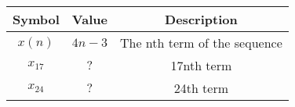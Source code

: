 
    \begin{tabular}{|c|c|c|}
    \hline
     \textbf{Symbol} & \textbf{Value} &
     \textbf{Description}\\
    \hline
     $x(n)$ &  $4n-3$ & The nth term of the sequence\\[6pt]
    \hline 
     $x_{17}$ &  $?$ & 17nth term \\[6pt]
    \hline
     $x_{24}$ &  $?$ & 24th term\\[6pt]
    \hline
     
\end{tabular}
